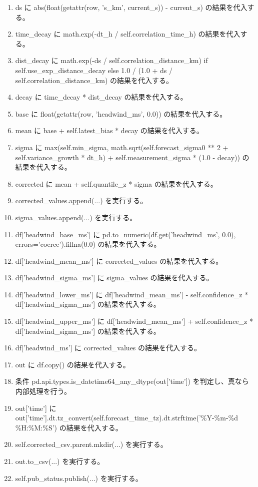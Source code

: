 \documentclass[a4paper,11pt]{article}
\begin{document}
\begin{enumerate}[leftmargin=1.8em]
\item   ds に abs(float(getattr(row, 's\_km', current\_s)) - current\_s) の結果を代入する。
\item   time\_decay に math.exp(-dt\_h / self.correlation\_time\_h) の結果を代入する。
\item   dist\_decay に math.exp(-ds / self.correlation\_distance\_km) if self.use\_exp\_distance\_decay else 1.0 / (1.0 + ds / self.correlation\_distance\_km) の結果を代入する。
\item   decay に time\_decay * dist\_decay の結果を代入する。
\item   base に float(getattr(row, 'headwind\_ms', 0.0)) の結果を代入する。
\item   mean に base + self.latest\_bias * decay の結果を代入する。
\item   sigma に max(self.min\_sigma, math.sqrt(self.forecast\_sigma0 ** 2 + self.variance\_growth * dt\_h) + self.measurement\_sigma * (1.0 - decay)) の結果を代入する。
\item   corrected に mean + self.quantile\_z * sigma の結果を代入する。
\item   corrected\_values.append(...) を実行する。
\item   sigma\_values.append(...) を実行する。
\item df['headwind\_base\_ms'] に pd.to\_numeric(df.get('headwind\_ms', 0.0), errors='coerce').fillna(0.0) の結果を代入する。
\item df['headwind\_mean\_ms'] に corrected\_values の結果を代入する。
\item df['headwind\_sigma\_ms'] に sigma\_values の結果を代入する。
\item df['headwind\_lower\_ms'] に df['headwind\_mean\_ms'] - self.confidence\_z * df['headwind\_sigma\_ms'] の結果を代入する。
\item df['headwind\_upper\_ms'] に df['headwind\_mean\_ms'] + self.confidence\_z * df['headwind\_sigma\_ms'] の結果を代入する。
\item df['headwind\_ms'] に corrected\_values の結果を代入する。
\item out に df.copy() の結果を代入する。
\item 条件 pd.api.types.is\_datetime64\_any\_dtype(out['time']) を判定し、真なら内部処理を行う。
\item   out['time'] に out['time'].dt.tz\_convert(self.forecast\_time\_tz).dt.strftime('\%Y-\%m-\%d \%H:\%M:\%S') の結果を代入する。
\item self.corrected\_csv.parent.mkdir(...) を実行する。
\item out.to\_csv(...) を実行する。
\item self.pub\_status.publish(...) を実行する。
            \end{enumerate}
\end{document}
